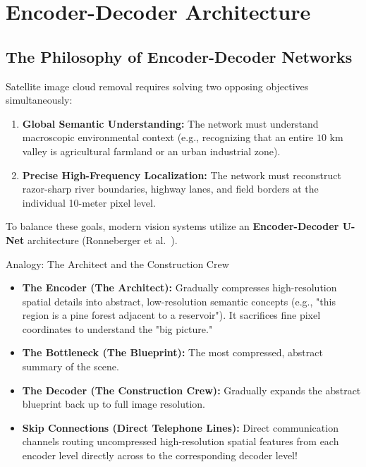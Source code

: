 \chapter{Encoder-Decoder Architecture}
\label{chap:ch09}

\section{The Philosophy of Encoder-Decoder Networks}
Satellite image cloud removal requires solving two opposing objectives simultaneously:
\begin{enumerate}
    \item \textbf{Global Semantic Understanding:} The network must understand macroscopic environmental context (e.g., recognizing that an entire $10\text{ km}$ valley is agricultural farmland or an urban industrial zone).
    \item \textbf{Precise High-Frequency Localization:} The network must reconstruct razor-sharp river boundaries, highway lanes, and field borders at the individual 10-meter pixel level.
\end{enumerate}

To balance these goals, modern vision systems utilize an \textbf{Encoder-Decoder U-Net} architecture (Ronneberger et al.~\cite{ronneberger2015unet}).

\begin{conceptbox}{Analogy: The Architect and the Construction Crew}
\begin{itemize}
    \item \textbf{The Encoder (The Architect):} Gradually compresses high-resolution spatial details into abstract, low-resolution semantic concepts (e.g., "this region is a pine forest adjacent to a reservoir"). It sacrifices fine pixel coordinates to understand the "big picture."
    \item \textbf{The Bottleneck (The Blueprint):} The most compressed, abstract summary of the scene.
    \item \textbf{The Decoder (The Construction Crew):} Gradually expands the abstract blueprint back up to full image resolution.
    \item \textbf{Skip Connections (Direct Telephone Lines):} Direct communication channels routing uncompressed high-resolution spatial features from each encoder level directly across to the corresponding decoder level!
\end{itemize}
\end{conceptbox}

